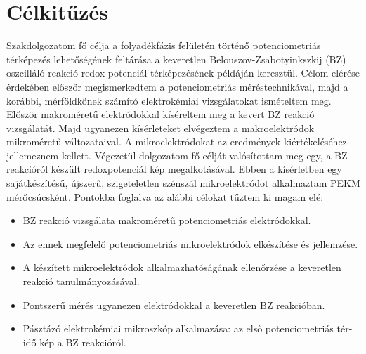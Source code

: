 \chapter{Célkitűzés}
\pagestyle{headings}
 Szakdolgozatom fő célja a folyadékfázis felületén történő potenciometriás térképezés lehetőségének feltárása a keveretlen Belouszov-Zsabotyinkszkij (BZ) oszcilláló reakció redox-potenciál térképezésének példáján keresztül. Célom elérése érdekében először megismerkedtem a potenciometriás méréstechnikával, majd a korábbi, mérföldkőnek számító elektrokémiai vizsgálatokat ismételtem meg. Először makroméretű elektródokkal kíséreltem meg a kevert BZ reakció vizsgálatát. Majd ugyanezen kísérleteket elvégeztem a makroelektródok mikroméretű változataival. A mikroelektródokat az eredmények kiértékeléséhez jellemeznem kellett. Végezetül dolgozatom fő célját valósítottam meg egy, a BZ reakcióról készült redoxpotenciál kép megalkotásával. Ebben a kísérletben egy sajátkészítésű, újszerű, szigeteletlen szénszál mikroelektródot alkalmaztam PEKM mérőcsúcsként. Pontokba foglalva az alábbi célokat tűztem ki magam elé:
 \begin{itemize}
 \item BZ reakció vizsgálata makroméretű potenciometriás elektródokkal.
 \item Az ennek megfelelő potenciometriás mikroelektródok elkészítése és jellemzése.
 \item A készített mikroelektródok alkalmazhatóságának ellenőrzése a keveretlen reakció tanulmányozásával.
 \item Pontszerű mérés ugyanezen elektródokkal a keveretlen BZ reakcióban.
 \item Pásztázó elektrokémiai mikroszkóp alkalmazása: az első potenciometriás tér-idő kép a BZ reakcióról.
 \end{itemize}
 